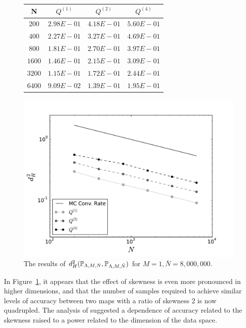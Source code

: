 \begin{figure}[h]
\begin{minipage}{.5\textwidth}
\begin{table}[H]
\begin{tabular}{ c | c | c | c }
N & $Q^{(1)}$ & $Q^{(2)}$ & $Q^{(4)}$\\ \hline \hline
$200$ & $2.98E-01$ & $4.18E-01$ & $5.60E-01$\\ \hline 
 
$400$ & $2.27E-01$ & $3.27E-01$ & $4.69E-01$\\ \hline 
 
$800$ & $1.81E-01$ & $2.70E-01$ & $3.97E-01$\\ \hline 
 
$1600$ & $1.46E-01$ & $2.15E-01$ & $3.09E-01$\\ \hline 
 
$3200$ & $1.15E-01$ & $1.72E-01$ & $2.44E-01$\\ \hline 
 
$6400$ & $9.09E-02$ & $1.39E-01$ & $1.95E-01$\\ \hline
\end{tabular}
\end{table}
\end{minipage}
\begin{minipage}{.45\textwidth}
		\includegraphics[width=\linewidth]{./images/Plot-reg_BigN_8000000_reg_M_1_rand_I_100000}
\end{minipage}
\caption{The results of $d^2_H(\mathbb{P}_{{\Lambda}, M, N}, \mathbb{P}_{{\Lambda}, M, \bar{N}})$ for $M = 1, \bar{N} = 8,000,000$.}
\label{fig:M1_3d}
\end{figure}
\FloatBarrier
In Figure~\ref{fig:M1_3d}, it appears that the effect of skewness is even more pronounced in higher dimensions, and that the number of samples required to achieve similar levels of accuracy between two maps with a ratio of skewness 2 is now quadrupled.
The analysis of \cite{BGE+15} suggested a dependence of accuracy related to the skewness raised to a power related to the dimension of the data space.


